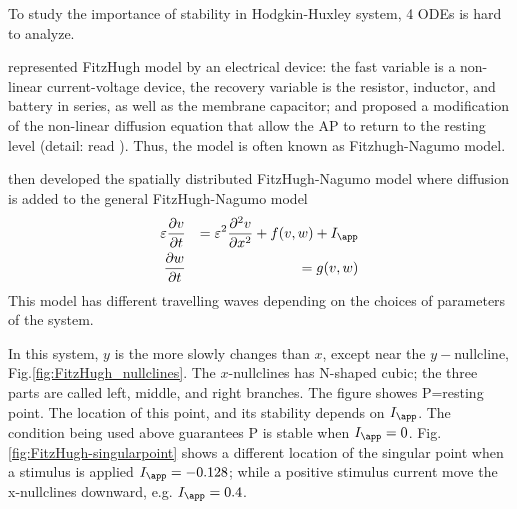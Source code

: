 To study the importance of stability in Hodgkin-Huxley system, 4 ODEs is
hard to analyze.


\citep{nagumo1962} represented FitzHugh model by an electrical device: the fast
variable is a non-linear current-voltage device, the recovery variable is the
resistor, inductor, and battery in series, as well as the membrane capacitor;
and proposed a modification of the non-linear diffusion equation that allow the
AP to return to the resting level (detail: read \citep{keener2008}). Thus, the
model is often known as Fitzhugh-Nagumo model.

\citep{nagumo1962} then developed the spatially distributed FitzHugh-Nagumo
model where diffusion is added to the general FitzHugh-Nagumo model
\begin{eqnarray}
\varepsilon \frac{\partial v}{\partial t}  &&= \varepsilon^2 \frac{\partial^2
v}{\partial x^2} + f(v,w) + I_\app \\
\frac{\partial w}{\partial t} &&= g(v,w)
\end{eqnarray}
This model has different travelling waves depending on the choices of parameters
of the system.

In this system, $y$ is the more slowly changes than $x$, except near the
$y-$nullcline, Fig.\ref{fig:FitzHugh_nullclines}. The $x$-nullclines has
N-shaped cubic; the three parts are called left, middle, and right branches. The
figure showes P=resting point. The location of this point, and its stability
depends on $I_\app$. The condition being used above guarantees P is stable when
$I_\app=0$. Fig.\ref{fig:FitzHugh-singularpoint} shows a different
location of the singular point when a stimulus is applied $I_\app=-0.128$; while
a positive stimulus current move the x-nullclines downward, e.g. $I_\app=0.4$. 

